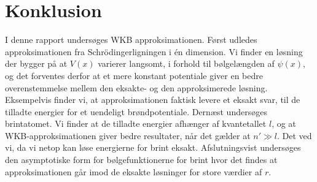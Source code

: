\section{Konklusion}
I denne rapport undersøges WKB approksimationen. Først udledes approksimationen fra Schrödingerligningen i én dimension. Vi finder en løsning der bygger på at $V(x)$ varierer langsomt, i forhold til bølgelængden af $\psi(x)$, og det forventes derfor at et mere konstant potentiale giver en bedre overenstemmelse mellem den eksakte- og den approksimerede løsning. Eksempelvis finder vi, at approksimationen faktisk levere et eksakt svar, til de tilladte energier for et uendeligt brøndpotentiale. Dernæst undersøges brintatomet. Vi finder at de tilladte energier afhænger af kvantetallet $l$, og at WKB-approksimationen giver bedre resultater, når det gælder at $n'\gg l$. Det ved vi, da vi netop kan løse energierne for brint eksakt. Afslutningsvist undersøges den asymptotiske form for bølgefunktionerne for brint hvor det findes at approksimationen går imod de eksakte løsninger for store værdier af $r$.
